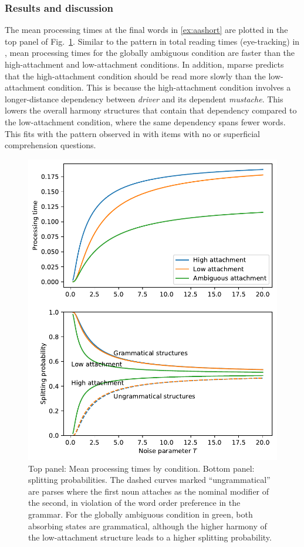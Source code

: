 \documentclass[a4paper, 12pt]{article}
\begin{document}
\subsubsection{Results and discussion}
The mean processing times at the final words in \ref{ex:aashort} are plotted in
the top panel of Fig.~\ref{fig:aa}. Similar to the pattern in total reading
times (eye-tracking) in \citet{traxler1998adjunct}, mean processing times for
the globally ambiguous condition are faster than the high-attachment and
low-attachment conditions.  In addition, mparse predicts that the
high-attachment condition should be read more slowly than the low-attachment
condition. This is because the high-attachment condition involves a
longer-distance dependency between \emph{driver} and its dependent
\emph{mustache}. This lowers the overall harmony structures that contain that
dependency compared to the low-attachment condition, where the same dependency
spans fewer words. This fits with the pattern observed in
\citet{swets2008underspecification} with items with no or superficial
comprehension questions.

\begin{figure}[htbp]

\includegraphics[width= \linewidth]{figures/mparse_intro_aanoisefig_1.pdf}

\caption{Top panel: Mean processing times by condition. Bottom panel: splitting
    probabilities. The dashed curves marked ``ungrammatical'' are parses where
    the first noun attaches as the nominal modifier of the second, in violation
    of the word order preference in the grammar. For the globally ambiguous
    condition in green, both absorbing states are grammatical, although the higher
    harmony of the low-attachment structure leads to a higher splitting
    probability.}\label{fig:aa}
\end{figure}
\end{document}
